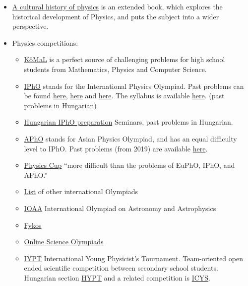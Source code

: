 \documentclass{article}
\begin{document}
\begin{itemize}
\item \href{https://www.goodreads.com/book/show/13335561-a-cultural-history-of-physics}{A cultural history of physics} is an extended book, which explores the historical development of Physics, and puts the subject into a wider perspective.

\item Physics competitions:
\begin{itemize}
\item \href{https://www.komal.hu/home.e.shtml}{KöMaL} is a perfect source of challenging problems for high school students from Mathematics, Physics and Computer Science.

\item \href{https://ipho-unofficial.org/}{IPhO} stands for the International Physics Olympiad. Past problems can be found \href{https://physprob.com/}{here}, \href{https://fks.sk/~bzduso/physics/ipho/}{here} and \href{https://omega4edu.org/physics.html}{here}. The syllabus is available \href{https://www.ipho-new.org/statutes-syllabus/}{here}. (past problems in \href{http://ipho.elte.hu/iphos.php}{Hungarian})

\item \href{http://ipho.elte.hu/}{Hungarian IPhO preparation} Seminars, past problems in Hungarian.

\item \href{http://asianphysicsolympiad.org/}{APhO} stands for Asian Physics Olympiad, and has an equal difficulty level to IPhO. Past problems (from 2019) are available \href{https://apho2019.asi.edu.au/resources/past-questions/}{here}.

\item \href{https://physicscup.ee/}{Physics Cup} ``more difficult than the problems of EuPhO, IPhO, and APhO.''

\item \href{http://eik.bme.hu/~vanko/fizika/olimpia.htm}{List} of other international Olympiads

\item \href{http://www.ioaastrophysics.org/}{IOAA} International Olympiad on Astronomy and Astrophysics

\item \href{https://fykos.org/en}{Fykos}

\item \href{https://www.onlinescienceolympiads.org/}{Online Science Olympiads}

\item \href{https://www.iypt.org/}{IYPT} International Young Physicist's Tournament. Team-oriented open ended scientific competition between secondary school students. Hungarian section \href{http://hypt.elte.hu/}{HYPT} and a related competition is \href{http://metal.elte.hu/~icys/}{ICYS}.


\end{itemize}
\end{itemize}
\end{document}
